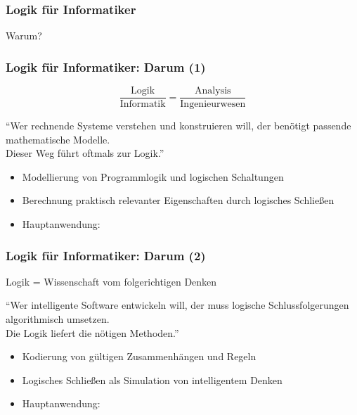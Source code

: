 \documentclass[aspectratio=1610,onlymath]{beamer}
\begin{document}
% 
% 
% 



\begin{frame}\frametitle{Logik für Informatiker}

\pause
\begin{center}
\Huge Warum?
\end{center}

\end{frame}

\begin{frame}\frametitle{Logik für Informatiker: Darum (1)}

\begin{center}
\LARGE 
\[ \frac{\text{Logik}}{\text{Informatik}} = \frac{\text{Analysis}}{\text{Ingenieurwesen}}\]

\bigskip
\large
"`Wer rechnende Systeme verstehen und konstruieren will, der benötigt passende mathematische Modelle.\\Dieser Weg führt oftmals zur Logik."'
\end{center}


\begin{itemize}
\item Modellierung von Programm\alert{logik} und \alert{logischen} Schaltungen
\item Berechnung praktisch relevanter Eigenschaften durch logisches Schließen
\item Hauptanwendung: 
\end{itemize}

\end{frame}

\begin{frame}\frametitle{Logik für Informatiker: Darum (2)}

\begin{center}
\LARGE 
Logik = Wissenschaft vom folgerichtigen Denken

\bigskip
\large
"`Wer intelligente Software entwickeln will, der muss logische Schlussfolgerungen algorithmisch umsetzen.\\
Die Logik liefert die nötigen Methoden."'
\end{center}


\begin{itemize}
\item Kodierung von gültigen Zusammenhängen und Regeln
\item Logisches Schließen als Simulation von intelligentem Denken
\item Hauptanwendung: 
\end{itemize}

\end{frame}
\end{document}
